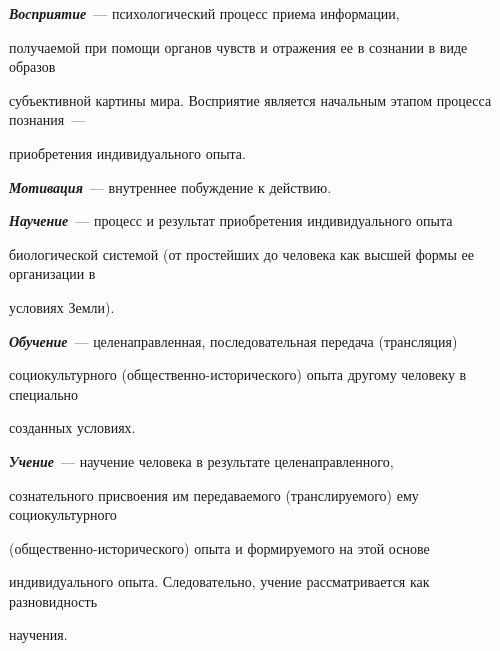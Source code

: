 {\bfseries\textit{Восприятие}}~--- психологический процесс приема информации, 


получаемой при помощи органов чувств и отражения ее в сознании в виде образов 


субъективной картины мира. Восприятие является начальным этапом процесса познания~---


приобретения индивидуального опыта.





{\bfseries\textit{Мотивация}}~--- внутреннее побуждение к действию.





{\bfseries\textit{Научение}}~--- процесс и результат приобретения индивидуального опыта 


биологической системой (от простейших до человека как высшей формы ее организации в 


условиях Земли).





{\bfseries\textit{Обучение}}~--- целенаправленная, последовательная передача (трансляция) 


социокультурного (общественно-исторического) опыта другому человеку в специально 


созданных условиях.





{\bfseries\textit{Учение}}~--- научение человека в результате целенаправленного, 


сознательного присвоения им передаваемого (транслируемого) ему социокультурного 


(обще\-ст\-вен\-но-ис\-то\-ри\-че\-ско\-го) опыта и формируемого на этой основе 


индивидуального опыта. Следовательно, учение рассматривается как разновидность 


научения.





